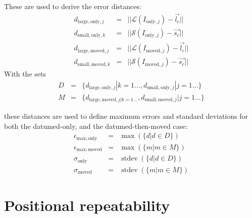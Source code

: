\documentclass[11pt,a4paper]{scrartcl}
\DeclareMathOperator{\stdev}{stdev}
\begin{document}
These are used to derive the error distances:
\begin{eqnarray}
  d_{\mathrm{large}, \mathrm{only}, j} & = & || \mathcal{L}(I_{\mathrm{only},j}) - \vec{l_c} ||\\
  d_{\mathrm{small}, \mathrm{only}, k} & = & || \mathcal{S}(I_{\mathrm{only},j}) - \vec{s_c} ||\\
  d_{\mathrm{large}, \mathrm{moved}, j} & = & ||  \mathcal{L}(I_{\mathrm{moved},j}) - \vec{l_c}|| \\
  d_{\mathrm{small}, \mathrm{moved}, k} & = & || \mathcal{S}(I_{\mathrm{moved},j}) - \vec{s_c} ||
\end{eqnarray}
With the sets
\begin{eqnarray}
  D & = & \{d_{\mathrm{large}, \mathrm{only}, j} | k = 1 \ldots, d_{\mathrm{small}, \mathrm{only}, j} | j = 1 \ldots \} \\
  M & = & \{d_{\mathrm{large}, \mathrm{moved}, j | k = 1 \ldots}, d_{\mathrm{small}, \mathrm{moved}, j}    | j = 1 \ldots \}
\end{eqnarray}

these distances are used to define maximum errors and standard deviations for both
the datumed-only, and the datumed-then-moved case:
\begin{eqnarray}
  \epsilon_\mathrm{max,only} & = & \max(\{d | d \in D\}) \\
  \epsilon_\mathrm{max,moved} & = & \max(\{m | m \in M\}) \\
  \sigma_\mathrm{only} & = & \stdev(\{d | d \in D\}) \\
  \sigma_\mathrm{moved} & = & \stdev(\{m | m \in M\})
\end{eqnarray}


\section{Positional repeatability}
\end{document}
